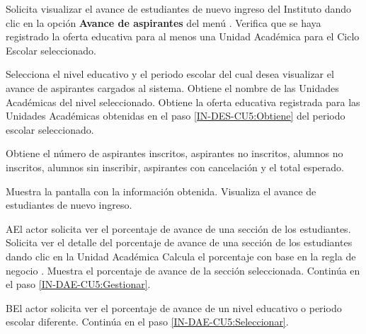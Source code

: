 \begin{UCtrayectoria}
	\UCpaso [\UCactor] Solicita visualizar el avance de estudiantes de nuevo ingreso del Instituto dando clic en la opción \textbf{Avance de aspirantes} del menú .
	\UCpaso Verifica que se haya registrado la oferta educativa para al menos una Unidad Académica para el Ciclo Escolar seleccionado. 
	
	\UCpaso [\UCactor] \label{IN-DAE-CU5:Seleccionar} Selecciona el nivel educativo y el periodo escolar del cual desea visualizar el avance de aspirantes cargados al sistema.
	\UCpaso \label{IN-DES-CU5:Obtiene} Obtiene el nombre de las Unidades Académicas del nivel seleccionado.
	\UCpaso Obtiene la oferta educativa registrada para las Unidades Académicas obtenidas en el paso \ref{IN-DES-CU5:Obtiene} del periodo escolar seleccionado.
	
	
	
%	
%	
%	
%	


	\UCpaso Obtiene el número de aspirantes inscritos, aspirantes no inscritos, alumnos no inscritos, alumnos sin inscribir, aspirantes con cancelación y el total esperado.
	
	\UCpaso Muestra la pantalla  con la información obtenida.
	\UCpaso [\UCactor] \label{IN-DAE-CU5:Gestionar} Visualiza el avance de estudiantes de nuevo ingreso.  
\end{UCtrayectoria}

\begin{UCtrayectoriaA}{A}{El actor solicita ver el porcentaje de avance de una sección de los estudiantes.}
	\UCpaso [\UCactor] Solicita ver el detalle del porcentaje de avance de una sección de los estudiantes dando clic en la Unidad Académica
	\UCpaso Calcula el porcentaje con base en la regla de negocio .
	\UCpaso Muestra el porcentaje de avance de la sección seleccionada.
	\UCpaso[] Continúa en el paso \ref{IN-DAE-CU5:Gestionar}.
\end{UCtrayectoriaA}

\begin{UCtrayectoriaA}{B}{El actor solicita ver el porcentaje de avance de un nivel educativo o periodo escolar diferente.}
	\UCpaso[] Continúa en el paso \ref{IN-DAE-CU5:Seleccionar}.
\end{UCtrayectoriaA}

